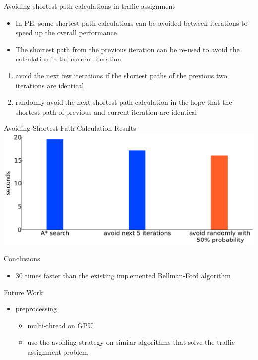 \documentclass{beamer}
\begin{document}
\begin{frame}{Avoiding shortest path calculations in traffic assignment}
    \begin{itemize}
        \item In PE, some shortest path calculations can be avoided between iterations to speed up the overall performance
        \item The shortest path from the previous iteration can be re-used to \alert{avoid} the calculation in the current iteration
    \end{itemize}
            \begin{enumerate}
                \item avoid the next few iterations if the shortest paths of the previous two iterations are identical
                \item randomly avoid the next shortest path calculation in the hope that the shortest path of previous and current iteration are identical
            \end{enumerate}
\end{frame}



\begin{frame}{Avoiding Shortest Path Calculation Results}
    \includegraphics[width=\textwidth, keepaspectratio]{img/random_runtime}
\end{frame}

\begin{frame}{Conclusions}
    \begin{itemize}
        \item 30 times faster than the existing implemented Bellman-Ford algorithm
    \end{itemize}
\end{frame}

\begin{frame}{Future Work}
    \begin{itemize}
        \item preprocessing
            \begin{itemize}
                \item multi-thread on GPU
                \item use the avoiding strategy on similar algorithms that solve the traffic assignment problem
            \end{itemize}
    \end{itemize}
\end{frame}
\end{document}
